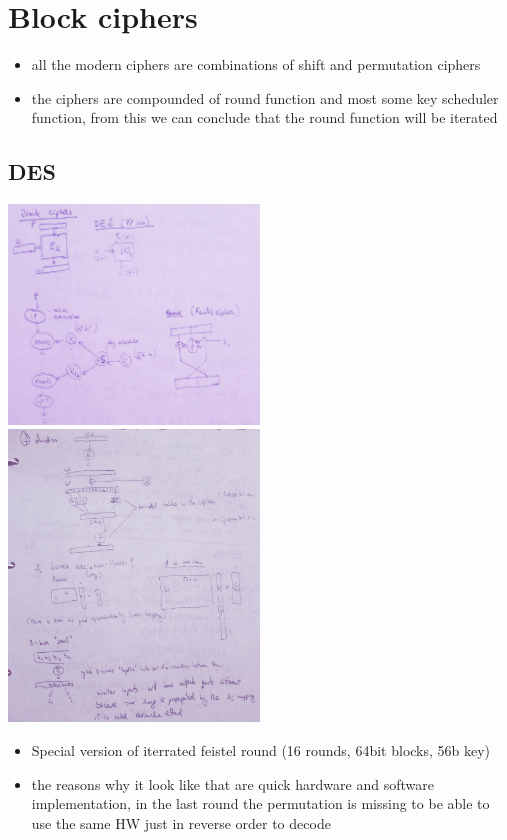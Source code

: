 \documentclass[a4paper,10pt]{article}
\begin{document}
\section*{Block ciphers}
\begin{itemize}
\item all the modern ciphers are combinations of shift and permutation ciphers
\item the ciphers are compounded of round function and most some key scheduler function, from this we can conclude that the round function will be iterated
\end{itemize}
\subsection*{DES}
\includegraphics[width=0.5\textwidth]{DES.jpg}
\includegraphics[width=0.5\textwidth]{des_F.jpg}
\begin{itemize}
\item Special version of iterrated feistel round (16 rounds, 64bit blocks, 56b key)
\item the reasons why it look like that are quick hardware and software implementation, in the last round the permutation is missing to be able to use the same HW just in reverse order to decode
\end{itemize}
\end{document}
